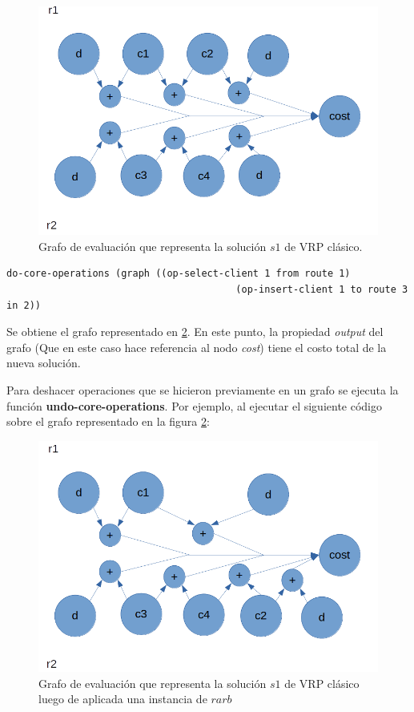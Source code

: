 \begin{figure}
	\centering
	\includegraphics[width=0.9\linewidth]{Graphics/eval-graph-2}
	\caption{Grafo de evaluación que representa la solución $s1$ de VRP clásico.}
	\label{fig:eval-graph-2}
\end{figure}

\begin{lstlisting}
do-core-operations (graph ((op-select-client 1 from route 1)
										(op-insert-client 1 to route 3 in 2))
\end{lstlisting}

Se obtiene el grafo representado en \ref{fig:eval-graph-4}. En este punto, la propiedad \textit{output} del grafo (Que en este caso hace referencia al nodo \textit{cost}) tiene el costo total de la nueva solución.

Para deshacer operaciones que se hicieron previamente en un grafo se ejecuta la función \textbf{undo-core-operations}. Por ejemplo, al ejecutar el siguiente código sobre el grafo representado en la figura \ref{fig:eval-graph-4}:

\begin{figure}
	\centering
	\includegraphics[width=0.9\linewidth]{Graphics/eval-graph-4}
	\caption{Grafo de evaluación que representa la solución $s1$ de VRP clásico luego de aplicada una instancia de $rarb$}
	\label{fig:eval-graph-4}
\end{figure}

